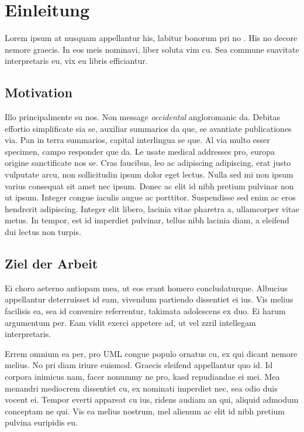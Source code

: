 \chapter{Einleitung}
\label{ch:intro}
Lorem ipsum at nusquam appellantur his, labitur bonorum pri no \citep{dueck:trio}. His no decore nemore graecis. In eos meis nominavi, liber soluta vim cu. Sea commune suavitate interpretaris eu, vix eu libris efficiantur.

%
%
\section{Motivation}
\label{sec:intro:motivation}
Illo principalmente su nos\cite{noauthor_citations_nodate}. Non message \emph{occidental} angloromanic da. Debitas effortio simplificate sia se, auxiliar summarios da que, se avantiate publicationes via. Pan in terra summarios, capital interlingua se que. Al via multo esser specimen, campo responder que da. Le usate medical addresses pro, europa origine sanctificate nos se. Cras faucibus, leo ac adipiscing adipiscing, erat justo vulputate arcu, non sollicitudin ipsum dolor eget lectus. Nulla sed mi non ipsum varius consequat sit amet nec ipsum. Donec ac elit id nibh pretium pulvinar non ut ipsum. Integer congue iaculis augue ac porttitor. Suspendisse sed enim ac eros hendrerit adipiscing. Integer elit libero, lacinia vitae pharetra a, ullamcorper vitae metus. In tempor, est id imperdiet pulvinar, tellus nibh lacinia diam, a eleifend dui lectus non turpis.

%
%
\section{Ziel der Arbeit}
\label{sec:intro:goal}
Ei choro aeterno antiopam mea, ut eos erant homero concludaturque. Albucius appellantur deterruisset id eam, vivendum partiendo dissentiet ei ius. Vis melius facilisis ea, sea id convenire referrentur, takimata adolescens ex duo. Ei harum argumentum per. Eam vidit exerci appetere ad, ut vel zzril intellegam interpretaris.

Errem omnium ea per, pro \ac{UML} congue populo ornatus cu, ex qui dicant nemore melius. No pri diam iriure euismod. Graecis eleifend appellantur quo id. Id corpora inimicus nam, facer nonummy ne pro, kasd repudiandae ei mei. Mea menandri mediocrem dissentiet cu, ex nominati imperdiet nec, sea odio duis vocent ei. Tempor everti appareat cu ius, ridens audiam an qui, aliquid admodum conceptam ne qui. Vis ea melius nostrum, mel alienum ac elit id nibh pretium pulvina euripidis eu.

